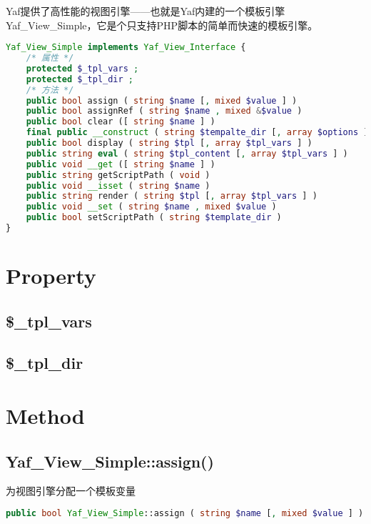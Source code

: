 Yaf提供了高性能的视图引擎——也就是Yaf内建的一个模板引擎Yaf\_View\_Simple，它是个只支持PHP脚本的简单而快速的模板引擎。




\begin{lstlisting}[language=PHP]
Yaf_View_Simple implements Yaf_View_Interface {
    /* 属性 */
    protected $_tpl_vars ;
    protected $_tpl_dir ;
    /* 方法 */
    public bool assign ( string $name [, mixed $value ] )
    public bool assignRef ( string $name , mixed &$value )
    public bool clear ([ string $name ] )
    final public __construct ( string $tempalte_dir [, array $options ] )
    public bool display ( string $tpl [, array $tpl_vars ] )
    public string eval ( string $tpl_content [, array $tpl_vars ] )
    public void __get ([ string $name ] )
    public string getScriptPath ( void )
    public void __isset ( string $name )
    public string render ( string $tpl [, array $tpl_vars ] )
    public void __set ( string $name , mixed $value )
    public bool setScriptPath ( string $template_dir )
}
\end{lstlisting}

\section{Property}


\subsection{\$\_tpl\_vars}


\subsection{\$\_tpl\_dir}


\section{Method}


\subsection{Yaf\_View\_Simple::assign()}

为视图引擎分配一个模板变量

\begin{lstlisting}[language=PHP]
public bool Yaf_View_Simple::assign ( string $name [, mixed $value ] )
\end{lstlisting}


